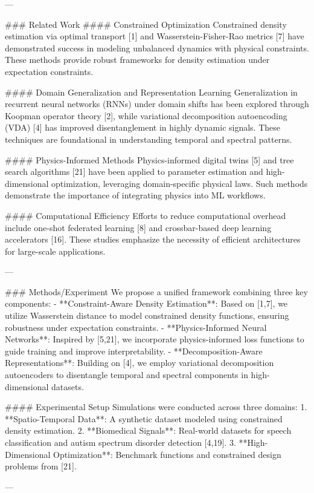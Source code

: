 ---

### Related Work
#### Constrained Optimization
Constrained density estimation via optimal transport [1] and Wasserstein-Fisher-Rao metrics [7] have demonstrated success in modeling unbalanced dynamics with physical constraints. These methods provide robust frameworks for density estimation under expectation constraints.

#### Domain Generalization and Representation Learning
Generalization in recurrent neural networks (RNNs) under domain shifts has been explored through Koopman operator theory [2], while variational decomposition autoencoding (VDA) [4] has improved disentanglement in highly dynamic signals. These techniques are foundational in understanding temporal and spectral patterns.

#### Physics-Informed Methods
Physics-informed digital twins [5] and tree search algorithms [21] have been applied to parameter estimation and high-dimensional optimization, leveraging domain-specific physical laws. Such methods demonstrate the importance of integrating physics into ML workflows.

#### Computational Efficiency
Efforts to reduce computational overhead include one-shot federated learning [8] and crossbar-based deep learning accelerators [16]. These studies emphasize the necessity of efficient architectures for large-scale applications.

---

### Methods/Experiment
We propose a unified framework combining three key components:
- **Constraint-Aware Density Estimation**: Based on [1,7], we utilize Wasserstein distance to model constrained density functions, ensuring robustness under expectation constraints.
- **Physics-Informed Neural Networks**: Inspired by [5,21], we incorporate physics-informed loss functions to guide training and improve interpretability.
- **Decomposition-Aware Representations**: Building on [4], we employ variational decomposition autoencoders to disentangle temporal and spectral components in high-dimensional datasets.

#### Experimental Setup
Simulations were conducted across three domains:
1. **Spatio-Temporal Data**: A synthetic dataset modeled using constrained density estimation.
2. **Biomedical Signals**: Real-world datasets for speech classification and autism spectrum disorder detection [4,19].
3. **High-Dimensional Optimization**: Benchmark functions and constrained design problems from [21].

---


